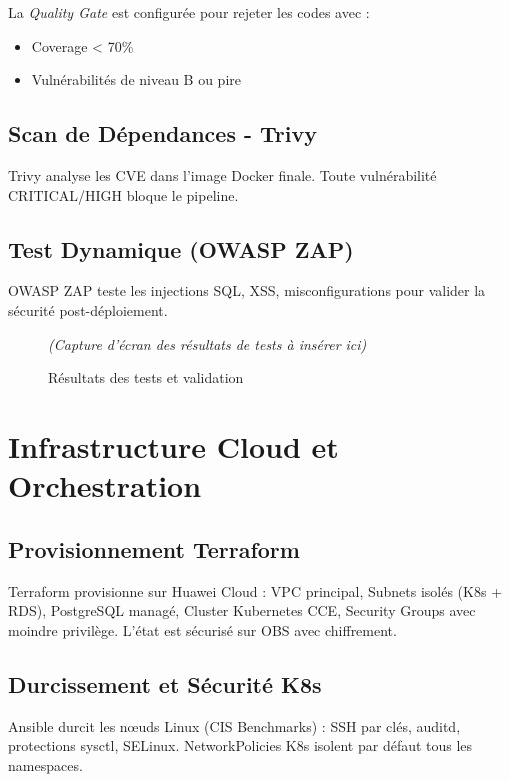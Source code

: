 \documentclass[12pt,a4paper]{article}
\begin{document}
La \textit{Quality Gate} est configurée pour rejeter les codes avec :
\begin{itemize}
    \item Coverage < 70\%
    \item Vulnérabilités de niveau B ou pire
\end{itemize}

\subsection{Scan de Dépendances - Trivy}

Trivy analyse les CVE dans l'image Docker finale. Toute vulnérabilité CRITICAL/HIGH bloque le pipeline.

\subsection{Test Dynamique (OWASP ZAP)}

OWASP ZAP teste les injections SQL, XSS, misconfigurations pour valider la sécurité post-déploiement.

\begin{figure}[ht]
    \centering
    \textit{(Capture d'écran des résultats de tests à insérer ici)}
    \caption{Résultats des tests et validation}
    \label{fig:tests}
\end{figure}

\clearpage
\section{Infrastructure Cloud et Orchestration}

\subsection{Provisionnement Terraform}

Terraform provisionne sur Huawei Cloud : VPC principal, Subnets isolés (K8s + RDS), PostgreSQL managé, Cluster Kubernetes CCE, Security Groups avec moindre privilège. L'état est sécurisé sur OBS avec chiffrement.

\subsection{Durcissement et Sécurité K8s}

Ansible durcit les nœuds Linux (CIS Benchmarks) : SSH par clés, auditd, protections sysctl, SELinux. NetworkPolicies K8s isolent par défaut tous les namespaces.
\end{document}
